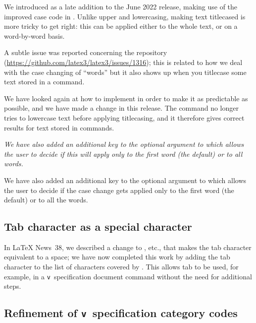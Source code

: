 \documentclass{ltnews}
\newenvironment{old}{\par\itshape}{\par}  %
\begin{document}
We introduced  as a late addition to the June 2022
release, making use of the improved case code in . Unlike
upper and lowercasing, making text titlecased is more tricky to get
right: this can be applied either
to the whole text, or on a word-by-word
basis.

A subtle issue was reported concerning the  repository
(\url{https://github.com/latex3/latex3/issues/1316}); this
is related to 
how we deal with the case changing of \enquote{words} but it also
shows up when you titlecase some text stored in a command.

We have looked again at how to implement  in order to make it as
predictable as possible, and we have made a change in this release. The
command no longer tries to lowercase text before applying titlecasing,
and it therefore gives correct results for text stored in commands.

\begin{old}
We have also added an additional key to the optional argument to
 which allows the user to decide if this will apply
only to the first word (the default) or to all words.
\end{old}


We have also added an additional key to the optional argument to
 which allows the user to decide if the case change gets applied 
only to the first word (the default) or to all the words.


\subsection{Tab character as a special character}

In \LaTeX{} News~38, we described a change to , etc., that makes
the tab character equivalent to a space; we have now completed this work by
adding the tab character to the 
list of characters covered by
. 
This allows tab to be used, for example, in a
\texttt{v}~specification document command 
without the need for additional steps.


\subsection{Refinement of \texttt{v}~specification category codes}
\end{document}
